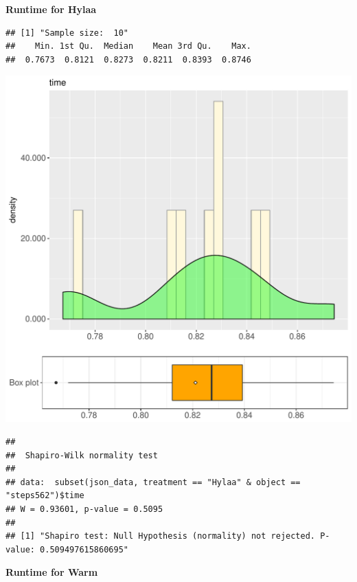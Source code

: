 \documentclass{article}\usepackage[]{graphicx}\usepackage[]{color}
\makeatletter
\def\maxwidth{ %
  \ifdim\Gin@nat@width>\linewidth
    \linewidth
  \else
    \Gin@nat@width
  \fi
}
\newenvironment{kframe}{%
 \def\at@end@of@kframe{}%
 \ifinner\ifhmode%
  \def\at@end@of@kframe{\end{minipage}}%
  \begin{minipage}{\columnwidth}%
 \fi\fi%
 \def\FrameCommand##1{\hskip\@totalleftmargin \hskip-\fboxsep
 \colorbox{shadecolor}{##1}\hskip-\fboxsep
     \hskip-\linewidth \hskip-\@totalleftmargin \hskip\columnwidth}%
 \MakeFramed {\advance\hsize-\width
   \@totalleftmargin\z@ \linewidth\hsize
   \@setminipage}}%
 {\par\unskip\endMakeFramed%
 \at@end@of@kframe}
\newenvironment{knitrout}{}{} %
\makeatother
\begin{document}
 \textbf{Runtime for Hylaa}
\begin{knitrout}
\color{fgcolor}\begin{kframe}
\begin{verbatim}
## [1] "Sample size:  10"
##    Min. 1st Qu.  Median    Mean 3rd Qu.    Max. 
##  0.7673  0.8121  0.8273  0.8211  0.8393  0.8746
\end{verbatim}
\end{kframe}
\includegraphics[width=\maxwidth]{figure/RH1_Hylaa_steps562-1} 
\begin{kframe}\begin{verbatim}
## 
## 	Shapiro-Wilk normality test
## 
## data:  subset(json_data, treatment == "Hylaa" & object == "steps562")$time
## W = 0.93601, p-value = 0.5095
## 
## [1] "Shapiro test: Null Hypothesis (normality) not rejected. P-value: 0.509497615860695"
\end{verbatim}
\end{kframe}
\end{knitrout}
 \textbf{Runtime for Warm}
\end{document}
